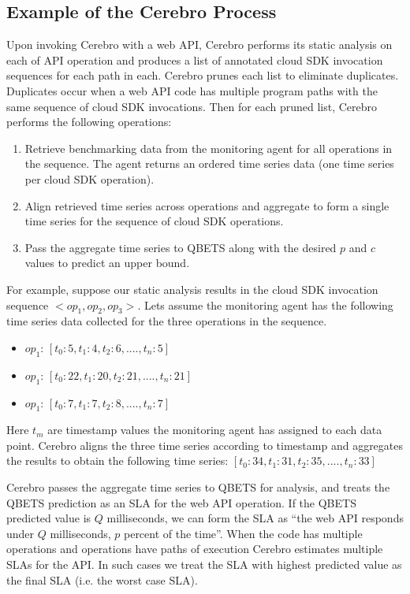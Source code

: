 \subsection{Example of the Cerebro Process}
Upon invoking Cerebro with a web API, Cerebro
performs its static analysis on each of API operation 
and produces a list of annotated cloud SDK invocation sequences
for each path in each.  Cerebro prunes each list to eliminate duplicates.
Duplicates occur when a web API code has
multiple program paths with the same sequence of cloud SDK invocations.
Then for each pruned list, Cerebro
performs the following operations:
\begin{enumerate}
\item Retrieve benchmarking data from the monitoring agent 
for all operations in the sequence. The agent returns
an ordered time series data (one time series per cloud SDK operation).
\item Align retrieved time series across operations and aggregate
to form a single time series for the sequence of cloud SDK operations.
\item Pass the aggregate time series to QBETS along with the 
desired $p$ and $c$ values to predict an upper bound. 
\end{enumerate}

For example, suppose our static analysis results in the
cloud SDK invocation sequence $<op_{1},op_{2},op_{3}>$. 
Lets assume the monitoring agent has the following
time series data collected for the three operations in the sequence.
\begin{itemize}
\item $op_{1}$: $[t_{0}: 5, t_{1}: 4, t_{2}: 6, ...., t_{n}: 5]$
\item $op_{1}$: $[t_{0}: 22, t_{1}: 20, t_{2}: 21, ...., t_{n}: 21]$
\item $op_{1}$: $[t_{0}: 7, t_{1}: 7, t_{2}: 8, ...., t_{n}: 7]$
\end{itemize}

Here $t_{m}$ are timestamp values the monitoring agent has assigned to 
each data point. Cerebro aligns the three
time series according to timestamp 
and aggregates the results
to obtain the following time series:
$[t_{0}: 34, t_{1}: 31, t_{2}: 35, ...., t_{n}: 33]$

Cerebro passes the aggregate time series to QBETS for analysis, and
treats the QBETS prediction as an SLA for the web API operation.
If the QBETS predicted value is $Q$ milliseconds, 
we can form the SLA as ``the web API responds 
under $Q$ milliseconds, $p$ percent of the time''. 
When the code has multiple operations and operations have 
paths of execution
Cerebro estimates multiple SLAs for the API. In
such cases we treat the SLA with highest predicted value 
as the final SLA (i.e. the worst case SLA).

